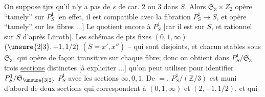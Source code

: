 
On suppose tjrs qu'il n'y a pas de  $s$ de car. 2 ou 3 dans $S$. Alors  $\mathfrak S_3\times Z_2$ opère ``tamely'' sur $P^1_S$ [en effet, il est compatible avec la fibration $P^1_S\to S$, et opère ``tamely'' sur les fibres $\ldots$] Le quotient    encore à $P^1_S$ [car il est \uline{} sur $S$, et rationnel sur $S$ d'après Lüroth]. Les schémas de pts fixes $(0,1,\infty)$ $(\unsure{2|3},-1,1/2)$ $(\bar S=x',x'')$ -- qui sont disjoints, et chacun stables sous $\mathfrak S_3$, qui   opère de façon  transitive sur chaque fibre; donc on obtient dans $P^1_S/\mathfrak S_3$ trois \uline{sections} distinctes [à expliciter $\ldots$] qu'on peut utiliser pour identifier $P^1_S/\mathfrak S_{\unsure{3|2}}$  $P^1_S$ avec les sections $\infty,0,1$. De $=$,  $P^1_S/(\mathbb Z/3)$ est muni d'abord de deux sections qui correspondent à $(0,1,\infty)$ et $(2,-1,1/2)$, et qui

